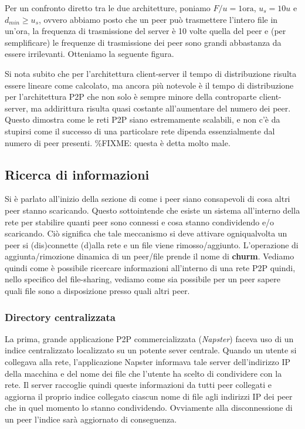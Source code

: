 Per un confronto diretto tra le due architetture, poniamo $F/u = 1 \text{ora}$, $u_s = 10u$ e $d_{min} \geq u_s$, ovvero abbiamo posto che un peer può trasmettere l'intero file in un'ora, la frequenza di trasmissione del server è 10 volte quella del peer e (per semplificare) le frequenze di trasmissione dei peer sono grandi abbastanza da essere irrilevanti. Otteniamo la seguente figura.


Si nota subito che per l'architettura client-server il tempo di distribuzione risulta essere lineare come calcolato, ma ancora più notevole è il tempo di distribuzione per l'architettura P2P che non solo è sempre minore della controparte client-server, ma addirittura risulta quasi costante all'aumentare del numero dei peer. Questo dimostra come le reti P2P siano estremamente scalabili, e non c'è da stupirsi come il successo di una particolare rete dipenda essenzialmente dal numero di peer presenti. \%FIXME: questa è detta molto male.

\subsection{Ricerca di informazioni}\label{ricerca-di-informazioni}

Si è parlato all'inizio della sezione di come i peer siano consapevoli di cosa altri peer stanno scaricando. Questo sottointende che esiste un sistema all'interno della rete per stabilire quanti peer sono connessi e cosa stanno condividendo e/o scaricando. Ciò significa che tale meccanismo si deve attivare ogniqualvolta un peer si (dis)connette (d)alla rete e un file viene rimosso/aggiunto. L'operazione di aggiunta/rimozione dinamica di un peer/file prende il nome di \textbf{churm}. Vediamo quindi come è possibile ricercare informazioni all'interno di una rete P2P quindi, nello specifico del file-sharing, vediamo come sia possibile per un peer sapere quali file sono a disposizione presso quali altri peer.

\subsubsection{Directory centralizzata}\label{directory-centralizzata}

La prima, grande applicazione P2P commercializzata (\emph{Napster}) faceva uso di un indice centralizzato localizzato su un potente sever centrale. Quando un utente si collegava alla rete, l'applicazione Napster informava tale server dell'indirizzo IP della macchina e del nome dei file che l'utente ha scelto di condividere con la rete. Il server raccoglie quindi queste informazioni da tutti peer collegati e aggiorna il proprio indice collegato ciascun nome di file agli indirizzi IP dei peer che in quel momento lo stanno condividendo. Ovviamente alla disconnessione di un peer l'indice sarà aggiornato di conseguenza.

